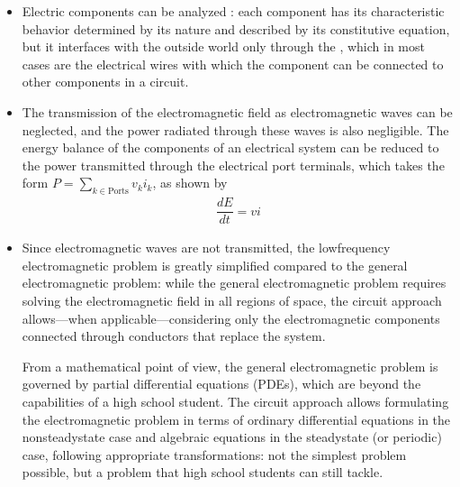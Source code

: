 \documentclass[letterpaper,10pt,english]{jupyterBook}
\begin{document}
\begin{itemize}
\item {} 
\sphinxAtStartPar
Electric components can be analyzed : each component has its characteristic behavior determined by its nature and described by its constitutive equation, but it interfaces with the outside world only through the , which in most cases are the electrical wires with which the component can be connected to other components in a circuit.

\item {} 
\sphinxAtStartPar
The transmission of the electromagnetic field as electromagnetic waves can be neglected, and the power radiated through these waves is also negligible. The energy balance of the components of an electrical system can be reduced to the power transmitted through the electrical port terminals, which takes the form \(P = \sum_{k \in \text{Ports}} v_k i_k\), as shown by {\hyperref[\detokenize{ch/circuits-energy:classical-electromagnetism-circuits-energy}]{}}
\begin{equation}\label{equation:ch/circuits-electric-components:eq:el-circuit:power}
\begin{split}\dfrac{d E}{dt} = v i\end{split}
\end{equation}
\item {} 
\sphinxAtStartPar
Since electromagnetic waves are not transmitted, the low\sphinxhyphen{}frequency electromagnetic problem is greatly simplified compared to the general electromagnetic problem: while the general electromagnetic problem requires solving the electromagnetic field in all regions of space, the circuit approach allows—when applicable—considering only the electromagnetic components connected through conductors that replace the system.%
\begin{footnote}[1]\sphinxAtStartFootnote
From a mathematical point of view, the general electromagnetic problem is governed by partial differential equations (PDEs), which are beyond the capabilities of a high school student. The circuit approach allows formulating the electromagnetic problem in terms of ordinary differential equations in the non\sphinxhyphen{}steady\sphinxhyphen{}state case and algebraic equations in the steady\sphinxhyphen{}state (or periodic) case, following appropriate transformations: not the simplest problem possible, but a problem that high school students can still tackle.
%
\end{footnote}

\end{itemize}
\end{document}
